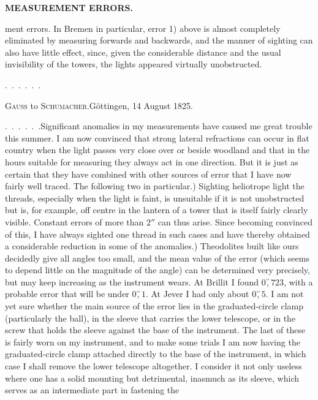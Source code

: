 \par\clearpage
\noindent\null\hfill{\small\textbf{MEASUREMENT ERRORS.}}\hfill{}\par\medskip
\noindent ment errors. In Bremen in particular, error 1) above is almost completely eliminated by measuring forwards and backwards, and the manner of sighting can also have little effect, since, given the considerable distance and the usual invisibility of the towers, the lights appeared virtually unobstructed.\par
\noindent .\ .\ .\ .\ .\ .
\begin{center}{\large\textsc{Gauss} to \textsc{Schumacher}.\quad Göttingen, 14 August 1825.}\end{center}
\par\noindent\hspace*{\parindent}.\ .\ .\ .\ .\ .\enspace Significant anomalies in my measurements have caused me great trouble this summer. I am now convinced that strong lateral refractions can occur in flat country when the light passes very close over or beside woodland and that in the hours suitable for measuring they always act in one direction. But it is just as certain that they have combined with other sources of error that I have now fairly well traced. The following two in particular.) Sighting heliotrope light  the threads, especially when the light is faint, is unsuitable if it is not unobstructed but is, for example, off centre in the lantern of a tower that is itself fairly clearly visible. Constant errors of more than $2''$ can thus arise. Since becoming convinced of this, I have always sighted  one thread in such cases and have thereby obtained a considerable reduction in some of the anomalies.) Theodolites built like ours decidedly give all angles too small, and the mean value of the error (which seems to depend little on the magnitude of the angle) can be determined very precisely, but may keep increasing as the instrument wears. At Brillit I found $0\overset{\prime\prime}{,}723$, with a probable error that will be under $0\overset{\prime\prime}{,}1$. At Jever I had only about $0\overset{\prime\prime}{,}5$. I am not yet sure whether the main source of the error lies in the graduated-circle clamp (particularly the ball), in the sleeve that carries the lower telescope, or in the screw that holds the sleeve against the base of the instrument. The last of these is fairly worn on my instrument, and to make some trials I am now having the graduated-circle clamp attached directly to the base of the instrument, in which case I shall remove the lower telescope altogether. I consider it not only useless where one has a solid mounting but detrimental, inasmuch as its sleeve, which serves as an intermediate part in fastening the


